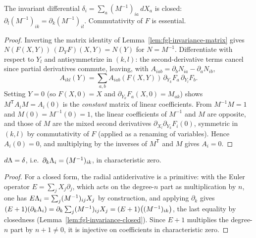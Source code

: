 \begin{lemma}
\label{lem:fgl-invariance-closed}
\leanok
{}
The invariant differential $\delta_i = \sum_a (M^{-1})_{ia}\,dX_a$ is closed:
$\partial_l (M^{-1})_{ik} = \partial_k (M^{-1})_{il}$. Commutativity of $F$ is
essential.
\end{lemma}
\begin{proof}
\leanok
Inverting the matrix identity of Lemma~\ref{lem:fgl-invariance-matrix} gives
$N(F(X,Y))\,(D_Y F)(X,Y) = N(Y)$ for $N = M^{-1}$. Differentiate with respect to $Y_l$
and antisymmetrize in $(k,l)$: the second-derivative terms cancel since partial
derivatives commute, leaving, with $A_{iab} = \partial_b N_{ia} - \partial_a N_{ib}$,
\[ A_{ikl}(Y) = \sum_{a,b} A_{iab}(F(X,Y))\,\partial_{Y_k}F_a\,\partial_{Y_l}F_b. \]
Setting $Y = 0$ (so $F(X,0) = X$ and $\partial_{Y_k}F_a(X,0) = M_{ak}$) shows
$M^{\mathsf T} A_i M = A_i(0)$ is the \emph{constant} matrix of linear coefficients.
From $M^{-1}M = 1$ and $M(0) = M^{-1}(0) = 1$, the linear coefficients of $M^{-1}$ and
$M$ are opposite, and those of $M$ are the mixed second derivatives
$\partial_{X_l}\partial_{Y_k} F_i(0)$, symmetric in $(k,l)$ by commutativity of $F$
(applied as a renaming of variables). Hence $A_i(0) = 0$, and multiplying by the
inverses of $M^{\mathsf T}$ and $M$ gives $A_i = 0$.
\end{proof}

\begin{lemma}
\label{lem:fgl-log-diff}
\leanok
{}
$d\Lambda = \delta$, i.e.\ $\partial_k \Lambda_i = (M^{-1})_{ik}$, in characteristic zero.
\end{lemma}
\begin{proof}
\leanok
For a closed form, the radial antiderivative is a primitive: with the Euler operator
$E = \sum_j X_j\partial_j$, which acts on the degree-$n$ part as multiplication by $n$,
one has $E\Lambda_i = \sum_j (M^{-1})_{ij}X_j$ by construction, and applying $\partial_k$
gives $(E+1)(\partial_k\Lambda_i) = \partial_k\sum_j (M^{-1})_{ij}X_j
= (E+1)\bigl((M^{-1})_{ik}\bigr)$, the last equality by closedness
(Lemma~\ref{lem:fgl-invariance-closed}). Since $E + 1$ multiplies the degree-$n$ part by
$n + 1 \ne 0$, it is injective on coefficients in characteristic zero.
\end{proof}

